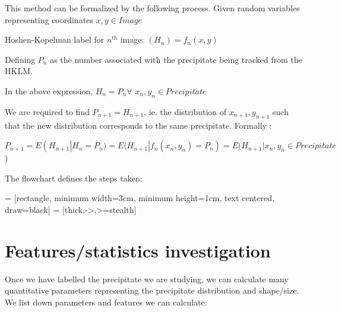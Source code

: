 \documentclass[12pt, a4paper]{report}
\begin{document}
This method can be formalized by the following process.
Given random variables representing coordinates $x,y\in{Image} $

Hoshen-Kopelman label for $n^{th}$ image: $(H_n) = f_n(x,y)$

Defining $P_n$ as the number associated with the precipitate being tracked from the HKLM.

In the above expression, $H_n = P_n \forall$ $x_n,y_n \in Precipitate$

We are required to find $P_{n+1}= H_{n+1}$, ie. the distribution of $x_{n+1},y_{n+1}$ such that the new distribution corresponds to the same precipitate. Formally :

$P_{n+1} = E(H_{n+1}| H_n = P_n ) = E(H_{n+1}|f_n(x_n,y_n)=P_n) = E(H_{n+1} | x_n,y_n \in Precipitate$)

The flowchart defines the steps taken:

\usetikzlibrary{shapes.geometric, arrows}
 = [rectangle, minimum width=3cm, minimum height=1cm, text centered, draw=black]
 = [thick,->,>=stealth]
\begin{center}
\end{center}



\section{Features/statistics investigation}

Once we have labelled the precipitate we are studying, we can calculate many quantitative parameters representing the precipitate distribution and shape/size. We list down parameters and features we can calculate:
\end{document}
